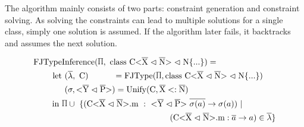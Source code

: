 The algorithm mainly consists of two parts: constraint generation and constraint solving.
As solving the constraints can lead to multiple solutions for a single class, simply one solution is assumed. If the algorithm later fails, it backtracks and assumes the next solution.

\begin{align*}
    \text{FJType}&\text{Inference}(\sprod{0.7}, \ \classheader \{ ... \}) = \\
    \text{let} & \ (\overline{\lambda}, \ \text{C}) \quad \quad \quad = \text{FJType}(\sprod{0.7}, \classheader \{ ... \}) \\
    & \ (\sigma, \yp) = \text{Unify}(\text{C}, \overline{\text{X}} <: \overline{\text{N}}) \\
    \text{in} \ & \sprod{0.7} \cup \ \{( \cm \ : \ \yp \ \oto{\sigma(a)}) \ | \\
    & \quad \quad \quad \quad \quad \quad \quad \quad \quad \quad \quad \quad \quad (\cm : \oto{a} ) \in \overline{\lambda} \}
\end{align*}

